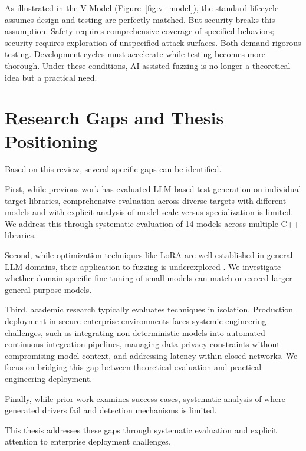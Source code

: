 As illustrated in the V-Model (Figure~\ref{fig:v_model}), the standard lifecycle assumes design and testing are perfectly matched. But security breaks this assumption. Safety requires comprehensive coverage of specified behaviors; security requires exploration of unspecified attack surfaces. Both demand rigorous testing. Development cycles must accelerate while testing becomes more thorough. Under these conditions, AI-assisted fuzzing is no longer a theoretical idea but a practical need.

\section{Research Gaps and Thesis Positioning}
\label{sec:lit_research_gaps}

Based on this review, several specific gaps can be identified.

First, while previous work has evaluated LLM-based test generation on individual target libraries, comprehensive evaluation across diverse targets with different models and with explicit analysis of model scale versus specialization is limited. We address this through systematic evaluation of 14 models across multiple C++ libraries.

Second, while optimization techniques like LoRA are well-established in general LLM domains, their application to fuzzing is underexplored \cite{Hu2021}. We investigate whether domain-specific fine-tuning of small models can match or exceed larger general purpose models.

Third, academic research typically evaluates techniques in isolation. Production deployment in secure enterprise environments faces systemic engineering challenges, such as integrating non deterministic models into automated continuous integration pipelines, managing data privacy constraints without compromising model context, and addressing latency within closed networks. We focus on bridging this gap between theoretical evaluation and practical engineering deployment.

Finally, while prior work examines success cases, systematic analysis of where generated drivers fail and detection mechanisms is limited.

This thesis addresses these gaps through systematic evaluation and explicit attention to enterprise deployment challenges.